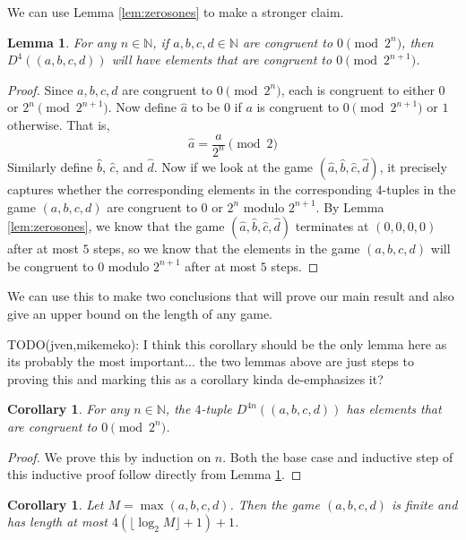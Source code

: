 \documentclass[12pt]{amsart}
\newtheorem{corollary}[theorem]{Corollary}
\newtheorem{lemma}[theorem]{Lemma}
\newcommand{\znn}{\mathbb{N}}
\begin{document}
We can use Lemma \ref{lem:zerosones} to make a stronger claim.

\begin{lemma}
For any $n \in \znn$, if $a, b, c, d \in \znn$ are congruent to $0\pmod{2^n}$, then $D^4((a, b, c, d))$ will have elements that are congruent to $0\pmod{2^{n+1}}$.
\label{lem:evenodd}
\end{lemma}

\begin{proof}
Since $a, b, c, d$ are congruent to $0\pmod{2^n}$, each is congruent to either $0$ or $2^n\pmod{2^{n+1}}$. Now define $\hat{a}$ to be $0$ if $a$ is congruent to $0\pmod{2^{n+1}}$ or $1$ otherwise. That is,
$$
\hat{a} = \frac{a}{2^n}\pmod{2}
$$
Similarly define $\hat{b}$, $\hat{c}$, and $\hat{d}$. Now if we look at the game $(\hat{a},\hat{b},\hat{c},\hat{d})$, it precisely captures whether the corresponding elements in the corresponding 4-tuples in the game $(a,b,c,d)$ are congruent to $0$ or $2^n$ modulo $2^{n+1}$. By Lemma \ref{lem:zerosones}, we know that the game $(\hat{a},\hat{b},\hat{c},\hat{d})$ terminates at $(0,0,0,0)$ after at most $5$ steps, so we know that the elements in the game $(a,b,c,d)$ will be congruent to $0$ modulo $2^{n+1}$ after at most $5$ steps.
\end{proof}

We can use this to make two conclusions that will prove our main result and also give an upper bound on the length of any game.

TODO(jven,mikemeko): I think this corollary should be the only lemma here as its probably the most important... the two lemmas above are just steps to proving this and marking this as a corollary kinda de-emphasizes it?

\begin{corollary}
For any $n \in \znn$, the $4$-tuple $D^{4n}((a, b, c, d))$ has elements that are congruent to $0\pmod{2^n}$.
\label{cor:pow2}
\end{corollary}

\begin{proof}
We prove this by induction on $n$.
Both the base case and inductive step of this inductive proof follow directly from Lemma \ref{lem:evenodd}.
\end{proof}

\begin{corollary}
Let $M=\max(a,b,c,d)$. Then the game $(a,b,c,d)$ is finite and has length at most $4(\lfloor\log_2{M}\rfloor + 1) + 1$.
\end{corollary}
\end{document}
